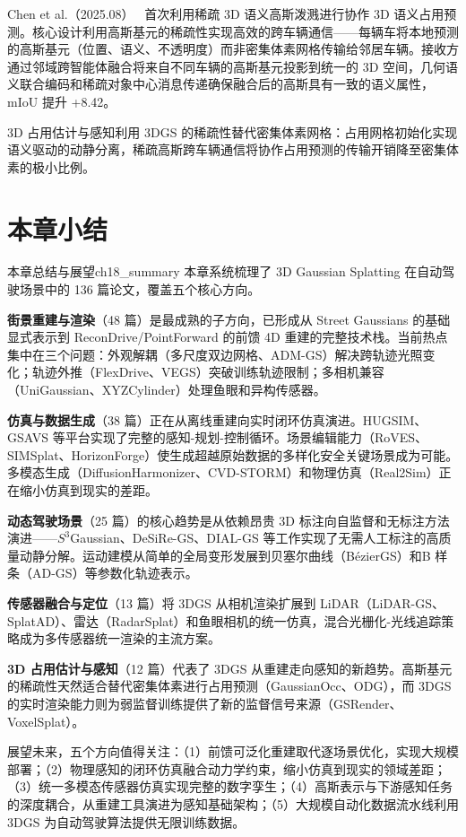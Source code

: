 Chen et al.（2025.08）~\cite{2508_10936} 首次利用稀疏 3D 语义高斯泼溅进行协作 3D 语义占用预测。核心设计利用高斯基元的稀疏性实现高效的跨车辆通信——每辆车将本地预测的高斯基元（位置、语义、不透明度）而非密集体素网格传输给邻居车辆。接收方通过邻域跨智能体融合将来自不同车辆的高斯基元投影到统一的 3D 空间，几何语义联合编码和稀疏对象中心消息传递确保融合后的高斯具有一致的语义属性，mIoU 提升 +8.42。

\begin{takeaway}
3D 占用估计与感知利用 3DGS 的稀疏性替代密集体素网格：占用网格初始化实现语义驱动的动静分离，稀疏高斯跨车辆通信将协作占用预测的传输开销降至密集体素的极小比例。
\end{takeaway}




\section*{本章小结}
\label{sec:18_summary}

\begin{futurebox}{本章总结与展望}{ch18_summary}
本章系统梳理了 3D Gaussian Splatting 在自动驾驶场景中的 136 篇论文，覆盖五个核心方向。

\textbf{街景重建与渲染}（48 篇）是最成熟的子方向，已形成从 Street Gaussians 的基础显式表示到 ReconDrive/PointForward 的前馈 4D 重建的完整技术栈。当前热点集中在三个问题：外观解耦（多尺度双边网格、ADM-GS）解决跨轨迹光照变化；轨迹外推（FlexDrive、VEGS）突破训练轨迹限制；多相机兼容（UniGaussian、XYZCylinder）处理鱼眼和异构传感器。

\textbf{仿真与数据生成}（38 篇）正在从离线重建向实时闭环仿真演进。HUGSIM、GSAVS 等平台实现了完整的感知-规划-控制循环。场景编辑能力（RoVES、SIMSplat、HorizonForge）使生成超越原始数据的多样化安全关键场景成为可能。多模态生成（DiffusionHarmonizer、CVD-STORM）和物理仿真（Real2Sim）正在缩小仿真到现实的差距。

\textbf{动态驾驶场景}（25 篇）的核心趋势是从依赖昂贵 3D 标注向自监督和无标注方法演进——$S^3$Gaussian、DeSiRe-GS、DIAL-GS 等工作实现了无需人工标注的高质量动静分解。运动建模从简单的全局变形发展到贝塞尔曲线（B\'ezierGS）和B 样条（AD-GS）等参数化轨迹表示。

\textbf{传感器融合与定位}（13 篇）将 3DGS 从相机渲染扩展到 LiDAR（LiDAR-GS、SplatAD）、雷达（RadarSplat）和鱼眼相机的统一仿真，混合光栅化-光线追踪策略成为多传感器统一渲染的主流方案。

\textbf{3D 占用估计与感知}（12 篇）代表了 3DGS 从重建走向感知的新趋势。高斯基元的稀疏性天然适合替代密集体素进行占用预测（GaussianOcc、ODG），而 3DGS 的实时渲染能力则为弱监督训练提供了新的监督信号来源（GSRender、VoxelSplat）。

展望未来，五个方向值得关注：（1）前馈可泛化重建取代逐场景优化，实现大规模部署；（2）物理感知的闭环仿真融合动力学约束，缩小仿真到现实的领域差距；（3）统一多模态传感器仿真实现完整的数字孪生；（4）高斯表示与下游感知任务的深度耦合，从重建工具演进为感知基础架构；（5）大规模自动化数据流水线利用 3DGS 为自动驾驶算法提供无限训练数据。
\end{futurebox}
